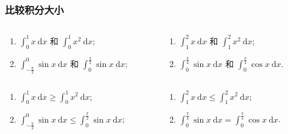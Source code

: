 \documentclass[
10pt,
aspectratio=43,
]{beamer}
\begin{document}
\begin{frame}
	\frametitle{比较积分大小}
	\everymath{\displaystyle}
	\begin{block}{}
		\begin{columns}
			\begin{column}{0.5\textwidth}
				\begin{enumerate}
					\item $\int_0^1 x \mathrm{~d} x$ 和 $\int_0^1 x^2 \mathrm{~d} x$;
					\item	$\int_{-\frac{\pi}{2}}^0 \sin x \mathrm{~d} x$ 和 $\int_0^{\frac{\pi}{2}} \sin x \mathrm{~d} x$;
				\end{enumerate}
			\end{column}
			\begin{column}{0.5\textwidth}
				\begin{enumerate}
					\item $\int_1^2 x \mathrm{~d} x$ 和 $\int_1^2 x^2 \mathrm{~d} x$;
					\item $\int_0^{\frac{\pi}{4}} \sin x \mathrm{~d} x$ 和 $\int_0^{\frac{\pi}{4}} \cos x \mathrm{~d} x$.
				\end{enumerate}
			\end{column}
		\end{columns}
	\end{block}
	\begin{exampleblock}{}
		\begin{columns}
			\begin{column}{0.5\textwidth}
				\begin{enumerate}
					\item $\int_0^1 x \mathrm{~d} x\ge\int_0^1 x^2 \mathrm{~d} x$;
					\item	$\int_{-\frac{\pi}{2}}^0 \sin x \mathrm{~d} x\le\int_0^{\frac{\pi}{2}} \sin x \mathrm{~d} x$;
				\end{enumerate}
			\end{column}
			\begin{column}{0.5\textwidth}
				\begin{enumerate}
					\item $\int_1^2 x \mathrm{~d} x\le\int_1^2 x^2 \mathrm{~d} x$;
					\item $\int_0^{\frac{\pi}{4}} \sin x \mathrm{~d} x=\int_0^{\frac{\pi}{4}} \cos x \mathrm{~d} x$.
				\end{enumerate}
			\end{column}
		\end{columns}
	\end{exampleblock}
\end{frame}
\end{document}
